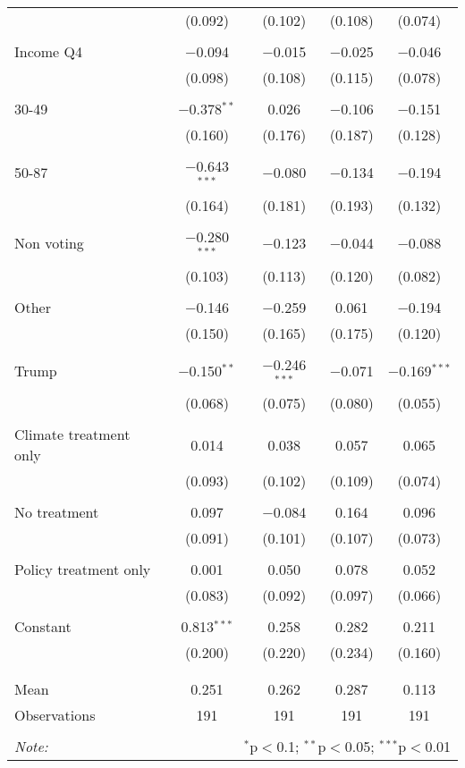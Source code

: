 \begin{tabular}{@{\extracolsep{5pt}}lcccc}
  & (0.092) & (0.102) & (0.108) & (0.074) \\ 
  & & & & \\ 
 Income Q4 & $-$0.094 & $-$0.015 & $-$0.025 & $-$0.046 \\ 
  & (0.098) & (0.108) & (0.115) & (0.078) \\ 
  & & & & \\ 
 30-49 & $-$0.378$^{**}$ & 0.026 & $-$0.106 & $-$0.151 \\ 
  & (0.160) & (0.176) & (0.187) & (0.128) \\ 
  & & & & \\ 
 50-87 & $-$0.643$^{***}$ & $-$0.080 & $-$0.134 & $-$0.194 \\ 
  & (0.164) & (0.181) & (0.193) & (0.132) \\ 
  & & & & \\ 
 Non voting & $-$0.280$^{***}$ & $-$0.123 & $-$0.044 & $-$0.088 \\ 
  & (0.103) & (0.113) & (0.120) & (0.082) \\ 
  & & & & \\ 
 Other & $-$0.146 & $-$0.259 & 0.061 & $-$0.194 \\ 
  & (0.150) & (0.165) & (0.175) & (0.120) \\ 
  & & & & \\ 
 Trump & $-$0.150$^{**}$ & $-$0.246$^{***}$ & $-$0.071 & $-$0.169$^{***}$ \\ 
  & (0.068) & (0.075) & (0.080) & (0.055) \\ 
  & & & & \\ 
 Climate treatment only & 0.014 & 0.038 & 0.057 & 0.065 \\ 
  & (0.093) & (0.102) & (0.109) & (0.074) \\ 
  & & & & \\ 
 No treatment & 0.097 & $-$0.084 & 0.164 & 0.096 \\ 
  & (0.091) & (0.101) & (0.107) & (0.073) \\ 
  & & & & \\ 
 Policy treatment only & 0.001 & 0.050 & 0.078 & 0.052 \\ 
  & (0.083) & (0.092) & (0.097) & (0.066) \\ 
  & & & & \\ 
 Constant & 0.813$^{***}$ & 0.258 & 0.282 & 0.211 \\ 
  & (0.200) & (0.220) & (0.234) & (0.160) \\ 
  & & & & \\ 
\hline \\[-1.8ex] 
Mean & 0.251 & 0.262 & 0.287 & 0.113 \\ 
Observations & 191 & 191 & 191 & 191 \\ 
\hline 
\hline \\[-1.8ex] 
\textit{Note:}  & \multicolumn{4}{r}{$^{*}$p$<$0.1; $^{**}$p$<$0.05; $^{***}$p$<$0.01} \\ 
\end{tabular} 
